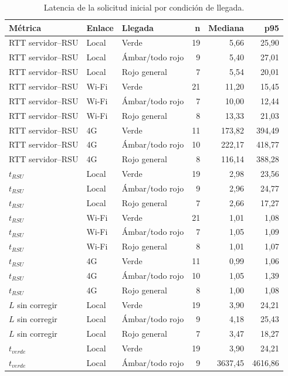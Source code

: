 \begin{table}[H]
\centering
\caption{Latencia de la solicitud inicial por condición de llegada.}
\label{tab:condicion_completa}
\small
\begin{tabular}{lllrrr}
\toprule
\textbf{Métrica} & \textbf{Enlace} & \textbf{Llegada} & \textbf{n} & \textbf{Mediana} & \textbf{p95} \\
\midrule
RTT servidor--RSU & Local & Verde & 19 & 5,66 & 25,90 \\
RTT servidor--RSU & Local & Ámbar/todo rojo & 9 & 5,40 & 27,01 \\
RTT servidor--RSU & Local & Rojo general & 7 & 5,54 & 20,01 \\
RTT servidor--RSU & Wi-Fi & Verde & 21 & 11,20 & 15,45 \\
RTT servidor--RSU & Wi-Fi & Ámbar/todo rojo & 7 & 10,00 & 12,44 \\
RTT servidor--RSU & Wi-Fi & Rojo general & 8 & 13,33 & 21,03 \\
RTT servidor--RSU & 4G & Verde & 11 & 173,82 & 394,49 \\
RTT servidor--RSU & 4G & Ámbar/todo rojo & 10 & 222,17 & 418,77 \\
RTT servidor--RSU & 4G & Rojo general & 8 & 116,14 & 388,28 \\
$t_{RSU}$ & Local & Verde & 19 & 2,98 & 23,56 \\
$t_{RSU}$ & Local & Ámbar/todo rojo & 9 & 2,96 & 24,77 \\
$t_{RSU}$ & Local & Rojo general & 7 & 2,66 & 17,27 \\
$t_{RSU}$ & Wi-Fi & Verde & 21 & 1,01 & 1,08 \\
$t_{RSU}$ & Wi-Fi & Ámbar/todo rojo & 7 & 1,05 & 1,09 \\
$t_{RSU}$ & Wi-Fi & Rojo general & 8 & 1,01 & 1,07 \\
$t_{RSU}$ & 4G & Verde & 11 & 0,99 & 1,06 \\
$t_{RSU}$ & 4G & Ámbar/todo rojo & 10 & 1,05 & 1,39 \\
$t_{RSU}$ & 4G & Rojo general & 8 & 1,00 & 1,08 \\
$L$ sin corregir & Local & Verde & 19 & 3,90 & 24,21 \\
$L$ sin corregir & Local & Ámbar/todo rojo & 9 & 4,18 & 25,43 \\
$L$ sin corregir & Local & Rojo general & 7 & 3,47 & 18,27 \\
$t_{verde}$ & Local & Verde & 19 & 3,90 & 24,21 \\
$t_{verde}$ & Local & Ámbar/todo rojo & 9 & 3637,45 & 4616,86 \\

\end{tabular}
\end{table}
